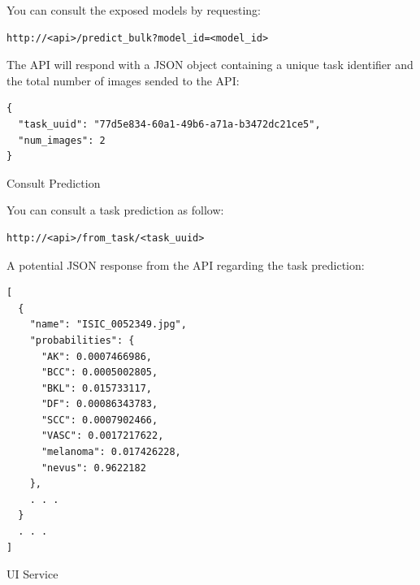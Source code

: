 \documentclass[dvipsnames,mathserif]{beamer}
\begin{document}
{\begin{frame}[fragile]
      \vspace{0.25cm}
      \footnotesize
      You can consult the exposed models by requesting:

      \vspace{0.1cm}

      \begin{Verbatim}[fontsize=\tiny]
http://<api>/predict_bulk?model_id=<model_id>
      \end{Verbatim}
      The API will respond with a JSON object containing a unique task identifier and
      the total number of images sended to the API:

      \vspace{0.1cm}

      \begin{Verbatim}[fontsize=\tiny]
{
  "task_uuid": "77d5e834-60a1-49b6-a71a-b3472dc21ce5",
  "num_images": 2
}
      \end{Verbatim}

    \end{frame}

    \begin{frame}[fragile]
      \large Consult Prediction

      \vspace{0.25cm}
      \footnotesize
      You can consult a task prediction as follow:

      \vspace{0.1cm}

      \begin{Verbatim}[fontsize=\tiny]
http://<api>/from_task/<task_uuid>
      \end{Verbatim}

      A potential JSON response from the API regarding the task prediction:

      \vspace{0.1cm}

      \begin{Verbatim}[fontsize=\tiny]
[
  {
    "name": "ISIC_0052349.jpg",
    "probabilities": {
      "AK": 0.0007466986,
      "BCC": 0.0005002805,
      "BKL": 0.015733117,
      "DF": 0.00086343783,
      "SCC": 0.0007902466,
      "VASC": 0.0017217622,
      "melanoma": 0.017426228,
      "nevus": 0.9622182
    },
    . . .
  }
  . . .
]
      \end{Verbatim}

    \end{frame}


    \begin{frame}[fragile]
      \large UI Service
      \vspace{0.25cm}


\end{frame}}
\end{document}
